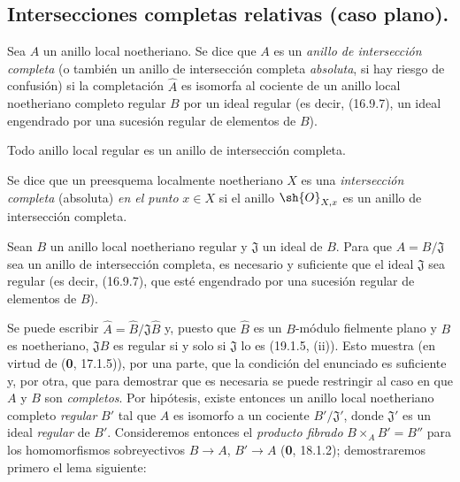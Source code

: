 \subsection{Intersecciones completas relativas (caso plano).}
\label{subsection:IV.19.3}


\begin{definition}[19.3.1]
\label{IV.19.3.1}
Sea $A$ un anillo local noetheriano. Se dice que $A$ es un \emph{anillo de intersección completa} (o también un anillo de intersección completa \emph{absoluta}, si hay riesgo de confusión) si la completación $\widehat A$ es isomorfa al cociente de un anillo local noetheriano completo regular $B$ por un ideal regular (es decir, (16.9.7), un ideal engendrado por una sucesión regular de elementos de $B$).

Todo anillo local regular es un anillo de intersección completa.

Se dice que un preesquema localmente noetheriano $X$ es una \emph{intersección completa} (absoluta) \emph{en el punto} $x\in X$ si el anillo $\sh{O}_{X,x}$ es un anillo de intersección completa.
\end{definition}

\begin{proposition}[19.3.2]
\label{IV.19.3.2}
Sean $B$ un anillo local noetheriano regular y $\mathfrak J$ un ideal de $B$. Para que $A=B/\mathfrak J$ sea un anillo de intersección completa, es necesario y suficiente que el ideal $\mathfrak J$ sea regular \textup{(es decir, (16.9.7),} que esté engendrado por una sucesión regular de elementos de $B$\textup{)}.
\end{proposition}

Se puede escribir $\widehat A=\widehat B/\mathfrak J\widehat B$ y, puesto que $\widehat B$ es un $B$-módulo fielmente plano y $B$ es noetheriano, $\mathfrak J\widehat B$ es regular si y solo si $\mathfrak J$ lo es (19.1.5, (ii)). Esto muestra (en virtud de (\textbf{0}, 17.1.5)), por una parte, que la condición del enunciado es suficiente y, por otra, que para demostrar que es necesaria se puede restringir al caso en que $A$ y $B$ son \emph{completos}. Por hipótesis, existe entonces un anillo local noetheriano completo \emph{regular} $B'$ tal que $A$ es isomorfo a un cociente $B'/\mathfrak J'$, donde $\mathfrak J'$ es un ideal \emph{regular} de $B'$. Consideremos entonces el \emph{producto fibrado} $B\times_A B'=B''$ para los homomorfismos sobreyectivos $B\to A$, $B'\to A$ (\textbf{0}, 18.1.2); demostraremos primero el lema siguiente:

